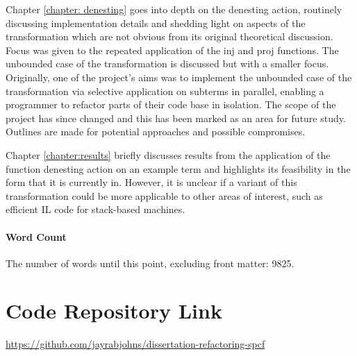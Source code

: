 \documentclass[12pt,a4paper]{report}
\theoremstyle{definition}
\theoremstyle{definition}
\theoremstyle{remark}
\begin{document}
Chapter \ref{chapter: denesting} goes into depth on the denesting action, routinely discussing implementation details and shedding light on aspects of the transformation which are not obvious from its original theoretical discussion. Focus was given to the repeated application of the inj and proj functions. The unbounded case of the transformation is discussed but with a smaller focus. Originally, one of the project's aims was to implement the unbounded case of the transformation via selective application on subterms in parallel, enabling a programmer to refactor parts of their code base in isolation. The scope of the project has since changed and this has been marked as an area for future study. Outlines are made for potential approaches and possible compromises. 

Chapter \ref{chapter:results} briefly discusses results from the application of the function denesting action on an example term and highlights its feasibility in the form that it is currently in. However, it is unclear if a variant of this transformation could be more applicable to other areas of interest, such as efficient IL code for stack-based machines.

\vfill
\subsubsection{Word Count}
The number of words until this point, excluding front matter: 9825.



\appendix

\chapter{Code Repository Link}
\url{https://github.com/jayrabjohns/dissertation-refactoring-spcf}



\end{document}
